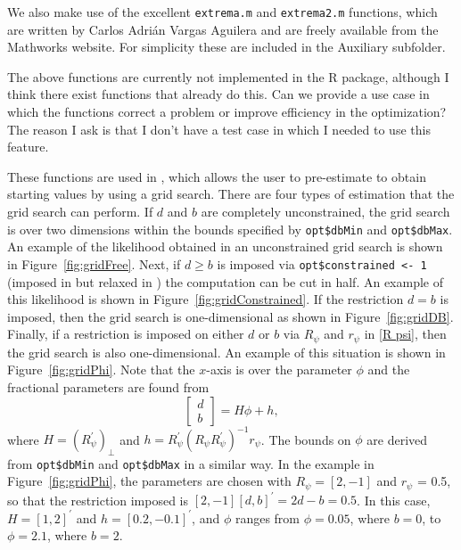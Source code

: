 \documentclass[article]{jss}
\newcommand{\fct}[1]{\code{#1()}}
\begin{document}
We also make use of the excellent \verb|extrema.m| and \verb|extrema2.m| functions, which are written by Carlos Adrián Vargas Aguilera and are freely available from the Mathworks website. For simplicity these are included in the Auxiliary subfolder.

\begin{leftbar}
The above functions are currently not implemented in the R package, although I think there exist functions that already do this. 
Can we provide a use case in which the functions correct a problem or improve efficiency in the optimization?
The reason I ask is that I don't have a test case in which I needed to use this feature. 
\end{leftbar}

These functions are used in \fct{FCVARlikeGrid}, which allows the user to pre-estimate to obtain starting values by using a grid search. There are four types of estimation that the grid search can perform. If $d$ and $b$ are completely unconstrained, the grid search is over two dimensions within the bounds specified by \verb|opt$dbMin| and \verb|opt$dbMax|. An example of the likelihood obtained in an unconstrained grid search is shown in Figure~\ref{fig:gridFree}. Next, if $d\ge b$ is imposed via \verb|opt$constrained <- 1| (imposed in \cite{johansen2012likelihood} but relaxed in \cite{JN2018}) the computation can be cut in half. An example of this likelihood is shown in Figure~\ref{fig:gridConstrained}. If the restriction $d=b$ is imposed, then the grid search is one-dimensional as shown in Figure~\ref{fig:gridDB}. Finally, if a restriction is imposed on either $d$ or $b$ via $R_\psi$ and $r_\psi$ in \eqref{R psi}, then the grid search is also one-dimensional. An example of this situation is shown in Figure~\ref{fig:gridPhi}. Note that the $x$-axis is over the parameter $\phi$ and the fractional parameters are found from
\begin{equation}
  \begin{bmatrix}
    d \\ b
  \end{bmatrix}
  = H\phi + h,
\end{equation}
where $H = (R_{\psi}^{\prime})_\perp$ and $h = R_{\psi}^{\prime} (R_\psi R_{\psi}^{\prime})^{-1} r_\psi$. The bounds on $\phi$ are derived from \verb|opt$dbMin| and \verb|opt$dbMax| in a similar way.
In the example in Figure~\ref{fig:gridPhi}, 
the parameters are chosen with $R_{\psi} = [2, -1]$ and $r_\psi$ = 0.5, 
so that the restriction imposed is $[2, -1] [d, b]^{\prime} = 2d - b = 0.5$.
In this case, $H = [1, 2]^{\prime}$ and $h = [0.2, -0.1]^{\prime}$, 
and $\phi$ ranges from $\phi = 0.05$, where $b = 0$, to $\phi = 2.1$, where $b = 2$. 
\end{document}
